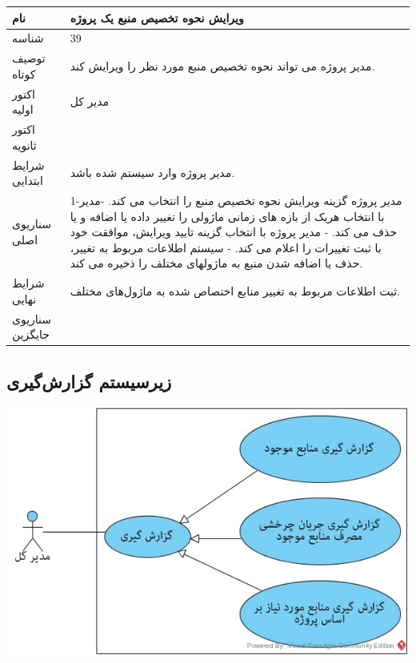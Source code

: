 \documentclass{article}
\begin{document}
\vspace{2cm}

\begin{tabular}{|p{2cm}|p{10cm}|}
\hline
نام
&
ویرایش نحوه تخصیص منبع یک پروژه
\\
\hline
شناسه
&
39
\\
\hline
توصیف کوتاه
&
مدیر پروژه می تواند نحوه تخصیص منبع مورد نظر را ویرایش کند. 
\\
\hline
اکتور اولیه
&
مدیر کل
\\
\hline
اکتور ثانویه
&

\\
\hline
شرایط ابتدایی
&
مدیر پروژه وارد سیستم شده باشد.
\\
\hline
سناریوی اصلی
&
1-مدیر پروژه گزینه ویرایش نحوه تخصیص منبع را انتخاب می کند.
\newline
2-مدیر با انتخاب هریک از بازه های زمانی ماژولی را تغییر داده یا اضافه و یا حذف می کند.
\newline
3- مدیر پروژه با انتخاب گزینه تایید ویرایش، موافقت خود با ثبت تغییرات را اعلام می کند.
\newline
4- سیستم اطلاعات مربوط به تغییر، حذف یا اضافه شدن منبع به ماژولهای مختلف را ذخیره می کند.  
\\
\hline
شرایط نهایی
&
ثبت اطلاعات مربوط به تغییر منابع اختصاص شده به ماژول‌های مختلف.
\\
\hline
سناریوی جایگزین
&

\\
\hline
\end{tabular}


\newpage
\subsection{زیرسیستم گزارش‌گیری}

\vspace{2cm}
\begin{center}
\includegraphics[width=\textwidth]{Diagrams/Reporting.jpg}
\end{center}
\end{document}
